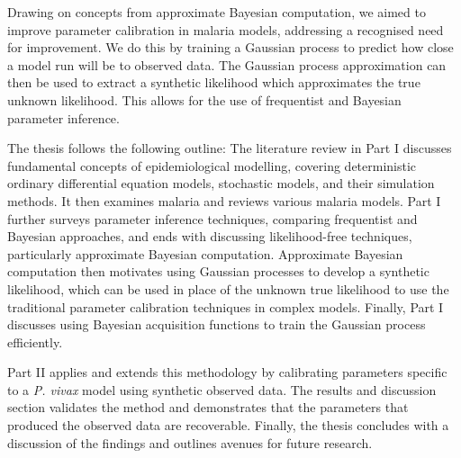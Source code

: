 Drawing on concepts from approximate Bayesian computation, we aimed to improve
parameter calibration in malaria models, addressing a recognised need for
improvement. We do this by training a Gaussian process to predict how close a
model run will be to observed data. The Gaussian process approximation
can then be used to extract a synthetic likelihood which approximates the
true unknown likelihood. This allows for the use of frequentist and Bayesian
parameter inference.

The thesis follows the following outline: The literature review in Part I
discusses fundamental concepts of epidemiological modelling, covering
deterministic ordinary differential equation models, stochastic models, and
their simulation methods. It then examines malaria and reviews various malaria
models. Part I further surveys parameter inference techniques, comparing
frequentist and Bayesian approaches, and ends with discussing likelihood-free
techniques, particularly approximate Bayesian computation.
Approximate Bayesian computation then motivates using Gaussian processes to
develop a synthetic likelihood, which can be used in place of the unknown true
likelihood to use the traditional parameter calibration techniques in complex
models. Finally, Part I discusses using Bayesian acquisition functions to train
the Gaussian process efficiently.

Part II applies and extends this methodology by calibrating parameters specific
to a \textit{P. vivax} model using synthetic observed data. The results and 
discussion
section validates the method and demonstrates that the parameters that produced
the observed data are recoverable. Finally, the thesis concludes with a
discussion of the findings and outlines avenues for future research.